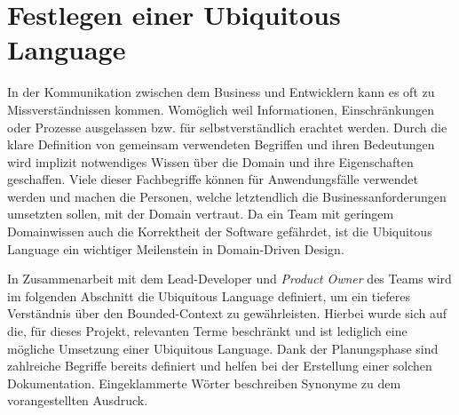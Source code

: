 \section{Festlegen einer Ubiquitous Language}

In der Kommunikation zwischen dem Business und Entwicklern kann es oft zu Missverständnissen kommen. Womöglich weil Informationen, Einschränkungen oder Prozesse ausgelassen bzw. für selbstverständlich erachtet werden. Durch die klare Definition von gemeinsam verwendeten Begriffen und ihren Bedeutungen wird implizit notwendiges Wissen über die Domain und ihre Eigenschaften geschaffen. Viele dieser Fachbegriffe können für Anwendungsfälle verwendet werden und machen die Personen, welche letztendlich die Businessanforderungen umsetzten sollen, mit der Domain vertraut. Da ein Team mit geringem Domainwissen auch die Korrektheit der Software gefährdet, ist die Ubiquitous Language ein wichtiger Meilenstein in Domain-Driven Design. \cite[S. 335ff.]{Evans.2011}

In Zusammenarbeit mit dem Lead-Developer und \emph{\Gls{Product Owner}} des Teams wird im folgenden Abschnitt die Ubiquitous Language definiert, um ein tieferes Verständnis über den Bounded-Context zu gewährleisten. Hierbei wurde sich auf die, für dieses Projekt, relevanten Terme beschränkt und ist lediglich eine mögliche Umsetzung einer Ubiquitous Language. Dank der Planungsphase sind zahlreiche Begriffe bereits definiert und helfen bei der Erstellung einer solchen Dokumentation. Eingeklammerte Wörter beschreiben Synonyme zu dem vorangestellten Ausdruck.

